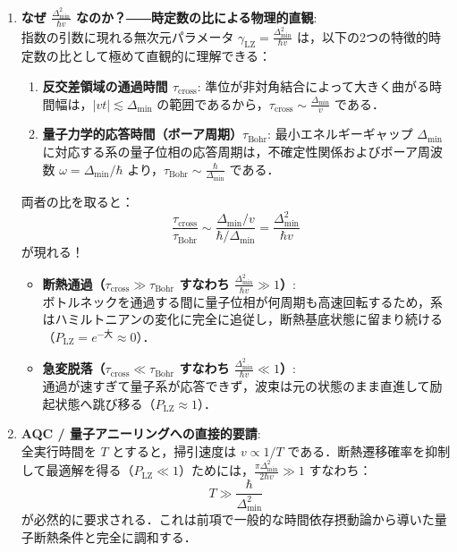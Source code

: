 \documentclass[11pt,a4paper,oneside,openany]{ltjsbook}
\theoremstyle{definition}
\theoremstyle{plain}
\theoremstyle{remark}
\begin{document}
\begin{insightbox}
\begin{enumerate}[label=\textbf{(\arabic*)}, leftmargin=*]
    \item \textbf{なぜ $\frac{\Delta_{\min}^2}{\hbar v}$ なのか？――時定数の比による物理的直観}:\\
    指数の引数に現れる無次元パラメータ $\gamma_{\text{LZ}} = \frac{\Delta_{\min}^2}{\hbar v}$ は，以下の2つの特徴的時定数の比として極めて直観的に理解できる：
    \begin{enumerate}[label=(\alph*)]
        \item \textbf{反交差領域の通過時間 $\tau_{\text{cross}}$}:
        準位が非対角結合によって大きく曲がる時間幅は，$|vt| \lesssim \Delta_{\min}$ の範囲であるから，$\tau_{\text{cross}} \sim \frac{\Delta_{\min}}{v}$ である．
        \item \textbf{量子力学的応答時間（ボーア周期）$\tau_{\text{Bohr}}$}:
        最小エネルギーギャップ $\Delta_{\min}$ に対応する系の量子位相の応答周期は，不確定性関係およびボーア周波数 $\omega = \Delta_{\min}/\hbar$ より，$\tau_{\text{Bohr}} \sim \frac{\hbar}{\Delta_{\min}}$ である．
    \end{enumerate}
    両者の比を取ると：
    \begin{equation}
        \frac{\tau_{\text{cross}}}{\tau_{\text{Bohr}}} \sim \frac{\Delta_{\min} / v}{\hbar / \Delta_{\min}} = \frac{\Delta_{\min}^2}{\hbar v}
    \end{equation}
    が現れる！
    \begin{itemize}
        \item \textbf{断熱通過（$\tau_{\text{cross}} \gg \tau_{\text{Bohr}}$ すなわち $\frac{\Delta_{\min}^2}{\hbar v} \gg 1$）}:\\
        ボトルネックを通過する間に量子位相が何周期も高速回転するため，系はハミルトニアンの変化に完全に追従し，断熱基底状態に留まり続ける（$P_{\text{LZ}} = e^{-\text{大}} \approx 0$）．
        \item \textbf{急変脱落（$\tau_{\text{cross}} \ll \tau_{\text{Bohr}}$ すなわち $\frac{\Delta_{\min}^2}{\hbar v} \ll 1$）}:\\
        通過が速すぎて量子系が応答できず，波束は元の状態のまま直進して励起状態へ跳び移る（$P_{\text{LZ}} \approx 1$）．
    \end{itemize}

    \item \textbf{AQC / 量子アニーリングへの直接的要請}:\\
    全実行時間を $T$ とすると，掃引速度は $v \propto 1/T$ である．断熱遷移確率を抑制して最適解を得る（$P_{\text{LZ}} \ll 1$）ためには，$\frac{\pi \Delta_{\min}^2}{2\hbar v} \gg 1$ すなわち：
    \begin{equation}
        T \gg \frac{\hbar}{\Delta_{\min}^2}
    \end{equation}
    が必然的に要求される．これは前項で一般的な時間依存摂動論から導いた量子断熱条件と完全に調和する．
\end{enumerate}
\end{insightbox}
\end{document}
